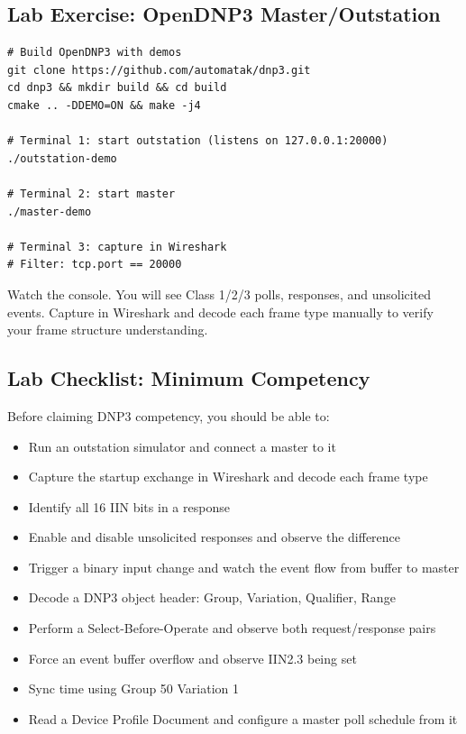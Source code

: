 \documentclass[11pt,twoside]{article}
\begin{document}
\subsection{Lab Exercise: OpenDNP3 Master/Outstation}

\begin{verbatim}
# Build OpenDNP3 with demos
git clone https://github.com/automatak/dnp3.git
cd dnp3 && mkdir build && cd build
cmake .. -DDEMO=ON && make -j4

# Terminal 1: start outstation (listens on 127.0.0.1:20000)
./outstation-demo

# Terminal 2: start master
./master-demo

# Terminal 3: capture in Wireshark
# Filter: tcp.port == 20000
\end{verbatim}

Watch the console. You will see Class 1/2/3 polls, responses, and unsolicited events. Capture in Wireshark and decode each frame type manually to verify your frame structure understanding.

\subsection{Lab Checklist: Minimum Competency}

Before claiming DNP3 competency, you should be able to:
\begin{itemize}[noitemsep]
  \item Run an outstation simulator and connect a master to it
  \item Capture the startup exchange in Wireshark and decode each frame type
  \item Identify all 16 IIN bits in a response
  \item Enable and disable unsolicited responses and observe the difference
  \item Trigger a binary input change and watch the event flow from buffer to master
  \item Decode a DNP3 object header: Group, Variation, Qualifier, Range
  \item Perform a Select-Before-Operate and observe both request/response pairs
  \item Force an event buffer overflow and observe IIN2.3 being set
  \item Sync time using Group 50 Variation 1
  \item Read a Device Profile Document and configure a master poll schedule from it
\end{itemize}
\end{document}
